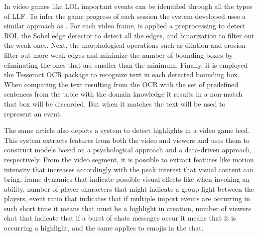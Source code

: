     In video games like \gls{LOL} important events can be identified through all the types of \gls{LLF}. To infer the game progress of each session the system developed uses a similar approach as \cite{OTRecognition_SoccerConcepts}. For each video frame, is applied a preprocessing to detect \gls{ROI}, the Sobel edge detector to detect all the edges, and binarization to filter out the weak ones. Next, the morphological operations such as dilation and erosion filter out more weak edges and minimize the number of bounding boxes by eliminating the ones that are smaller than the minimum. Finally, it is employed the Tesseract OCR package to recognize text in each detected bounding box. When comparing the text resulting from the \gls{OCR} with the set of predefined sentences from the table with the domain knowledge it results in a non-match that box will be discarded. But when it matches the text will be used to represent an event.

    The same article also depicts a system to detect highlights in a video game feed. This system extracts features from both the video and viewers and uses them to construct models based on a psychological approach and a data-driven approach, respectively. From the video segment, it is possible to extract features like motion intensity that increases accordingly with the peak interest that visual content can bring, frame dynamics that indicate possible visual effects like when invoking an ability, number of player characters that might indicate a group fight between the players, event ratio that indicates that if multiple import events are occurring in such short time it means that must be a highlight in creation, number of viewers chat that indicate that if a burst of chats messages occur it means that it is occurring a highlight, and the same applies to emojis in the chat. 

    

